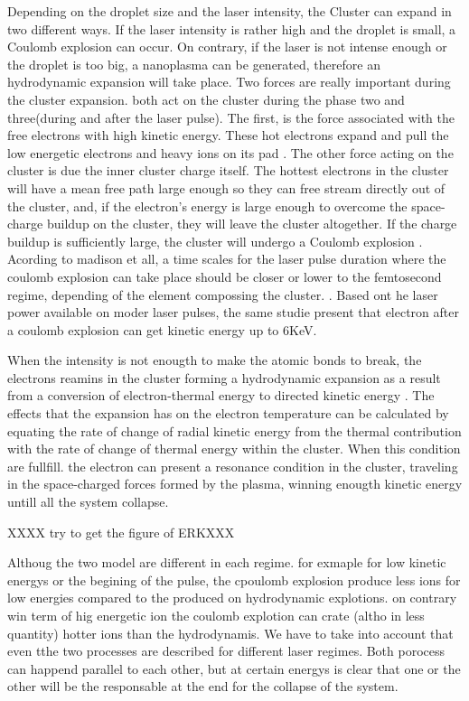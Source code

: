 Depending on the droplet size and the laser intensity, the Cluster can expand in two different ways. If the laser intensity is rather high and the droplet is small, a Coulomb explosion can occur. On contrary, if the laser is not intense enough or the droplet is too big, a nanoplasma can be generated, therefore an hydrodynamic expansion will take place. 
Two forces are really important during the cluster expansion. both act on the cluster during the phase two and three(during and after the laser pulse). The first, is the force associated with the free electrons with high kinetic energy. These hot electrons expand and pull the low energetic electrons and heavy ions on its pad  \cite{ditmire_interaction_1996}. The other force acting on the cluster is due the inner cluster charge itself. The hottest electrons in the cluster will have a mean free path large enough so they can free stream directly out of the cluster, and, if the electron’s energy is large enough to overcome the space-charge buildup on the cluster, they will leave the cluster altogether. If the charge buildup is sufficiently large, the cluster will undergo a Coulomb explosion \cite{haught_formation_1970}. Acording to madison et all, a time scales for the laser pulse duration  where the coulomb explosion can take place should be  closer or lower to the femtosecond regime, depending  of the element compossing the cluster. \cite{madison_role_2004}. Based ont he laser power available on moder laser pulses, the same studie present that electron after a coulomb explosion can get kinetic energy up to 6KeV.


When the intensity is not enougth to make the atomic bonds to break, the  electrons reamins in the cluster forming a  hydrodynamic expansion as a result from a conversion of electron-thermal energy to directed kinetic
energy \cite{erk_nobel_2009}. The effects that the expansion has on the electron temperature can be calculated by equating the rate of change of radial kinetic energy from the thermal contribution with the rate of change of thermal energy within the cluster. When this condition are fullfill. the electron can present a resonance condition in the cluster, traveling in the space-charged forces formed by the plasma, winning enougth kinetic energy untill all the system collapse.

XXXX try to get the figure of ERKXXX

Althoug the two model are different in each regime. for exmaple for low kinetic energys or the begining of the pulse, the cpoulomb explosion produce less ions for low energies compared to the produced on hydrodynamic explotions. on contrary win term of hig energetic ion the coulomb explotion can crate (altho in less quantity) hotter ions than the hydrodynamis.
We have to take into account that even tthe two processes are described for different laser regimes. Both porocess can happend parallel to each other, but at certain energys is clear that one or the other will be the responsable at the end for the collapse of the system.

